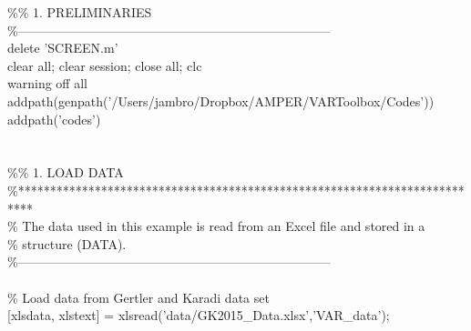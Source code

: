 \hspace{1mm}\textcolor{matlabgreen}{\%}\textcolor{matlabgreen}{\% 1. PRELIMINARIES }\\ 
\hspace{1mm}\textcolor{matlabgreen}{\%--------------------------------------------------------------------------  }\\ 
\hspace{1mm}delete \textcolor{matlabpurple}{'SCREEN.m'}  \\ 
\hspace{1mm}clear all; clear session; close all; clc \\ 
\hspace{1mm}warning off all \\ 
\hspace{1mm}addpath(genpath(\textcolor{matlabpurple}{'/Users/jambro/Dropbox/AMPER/VARToolbox/Codes'})) \\ 
\hspace{1mm}addpath(\textcolor{matlabpurple}{'codes'}) \\ 
\hspace{1mm} \\ 
\hspace{1mm} \\ 
\hspace{1mm}\textcolor{matlabgreen}{\%}\textcolor{matlabgreen}{\% 1. LOAD DATA }\\ 
\hspace{1mm}\textcolor{matlabgreen}{\%**************************************************************************  }\\ 
\hspace{1mm}\textcolor{matlabgreen}{\% The data used in this example is read from an Excel file and stored in a }\\ 
\hspace{1mm}\textcolor{matlabgreen}{\% structure (DATA). }\\ 
\hspace{1mm}\textcolor{matlabgreen}{\%--------------------------------------------------------------------------  }\\ 
\hspace{1mm} \\ 
\hspace{1mm}\textcolor{matlabgreen}{\% Load data from Gertler and Karadi data set }\\ 
\hspace{1mm}[xlsdata, xlstext] = xlsread(\textcolor{matlabpurple}{'data/GK2015\_Data.xlsx'},\textcolor{matlabpurple}{'VAR\_data'}); \\ 
